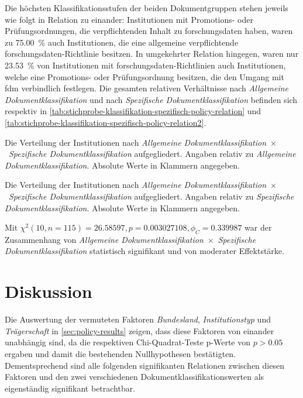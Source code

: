 \noindent Die höchsten Klassifikationsstufen der beiden Dokumentgruppen stehen jeweils wie folgt in Relation zu einander:
Institutionen mit Promotions- oder Prüfungsordnungen, die verpflichtenden Inhalt zu \gls{forschungsdaten} haben, waren zu \SI{75,00}{\percent} auch Institutionen, die eine allgemeine verpflichtende \gls{forschungsdaten}-Richtlinie besitzen.
In umgekehrter Relation hingegen, waren nur \SI{23,53}{\percent} von Institutionen mit \gls{forschungsdaten}-Richtlinien auch Institutionen, welche eine Promotions- oder Prüfungsordnung besitzen, die den Umgang mit \gls{fdm} verbindlich festlegen.
Die gesamten relativen Verhältnisse nach \textit{Allgemeine Dokumentklassifikation} und nach \textit{Spezifische Dokumentklassifikation} befinden sich respektiv in \cref{tab:stichprobe-klassifikation-spezifisch-policy-relation} und \cref{tab:stichprobe-klassifikation-spezifisch-policy-relation2}.
\begin{table}[!htbp]
	\caption{Die Verteilung der Institutionen nach \textit{Allgemeine Dokumentklassifikation}~$\times$~\textit{Spezifische Dokumentklassifikation} aufgegliedert.
    Angaben relativ zu \textit{Allgemeine Dokumentklassifikation}.
    Absolute Werte in Klammern angegeben.}
    
	\label{tab:stichprobe-klassifikation-spezifisch-policy-relation}
\end{table}
\begin{table}[!htbp]
	\caption{Die Verteilung der Institutionen nach \textit{Allgemeine Dokumentklassifikation}~$\times$~\textit{Spezifische Dokumentklassifikation} aufgegliedert.
    Angaben relativ zu \textit{Spezifische Dokumentklassifikation}.
    Absolute Werte in Klammern angegeben.}
    
	\label{tab:stichprobe-klassifikation-spezifisch-policy-relation2}
\end{table}

Mit $\chi^2 (\num{10}, n=\num{115}) = \num[round-mode=places,round-precision=2]{26,58597}, p = \num[round-mode=places,round-precision=3]{0,003027108},\phi_C=\num[round-mode=places,round-precision=2]{0.339987}$ war der Zusammenhang von \textit{Allgemeine Dokumentklassifikation}~$\times$~\textit{Spezifische Dokumentklassifikation} statistisch signifikant und von moderater Effektstärke.


\section{Diskussion}\label{sec:policy-discussion}
Die Auswertung der vermuteten Faktoren \textit{Bundesland}, \textit{Institutionstyp} und \textit{Trägerschaft} in \cref{sec:policy-results} zeigen, dass diese Faktoren von einander unabhängig sind, da die respektiven Chi-Quadrat-Teste p-Werte von $p>\num{0,05}$ ergaben und damit die bestehenden Nullhypothesen bestätigten.
Dementsprechend sind alle folgenden signifikanten Relationen zwischen diesen Faktoren und den zwei verschiedenen Dokumentklassifikationswerten als eigenständig signifikant betrachtbar.

